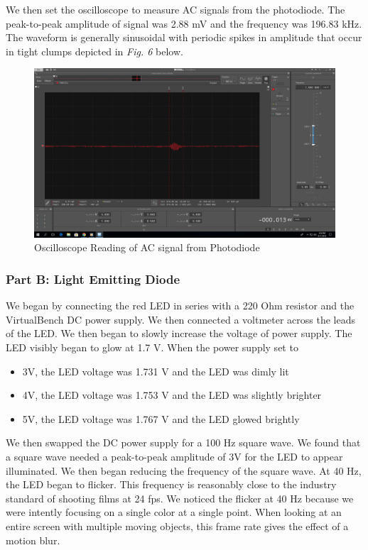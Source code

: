 \documentclass[10pt]{article}
\begin{document}
We then set the oscilloscope to measure AC signals from the photodiode. The peak-to-peak amplitude of signal was 2.88 mV and the frequency was 196.83 kHz. The waveform is generally sinusoidal with periodic spikes in amplitude that occur in tight clumps depicted in \textit{Fig. 6} below. 
\begin{center}
	\begin{figure} [H]
		\centering
		\includegraphics[scale = 0.22]{images/zoom.png}
		\caption{Oscilloscope Reading of AC signal from Photodiode}
		\label{fig:zoom}
	\end{figure}
\end{center}

\subsubsection{Part B: Light Emitting Diode}
We began by connecting the red LED in series with a 220 Ohm resistor and the VirtualBench DC power supply. We then connected a voltmeter across the leads of the LED. We then began to slowly increase the voltage of power supply. The LED visibly began to glow at 1.7 V. When the power supply set to 
\begin{itemize}
	\item 3V, the LED voltage was 1.731 V and the LED was dimly lit
	\item 4V, the LED voltage was 1.753 V and the LED was slightly brighter
	\item 5V, the LED voltage was 1.767 V and the LED glowed brightly
\end{itemize}

We then swapped the DC power supply for a 100 Hz square wave. We found that a square wave needed a peak-to-peak amplitude of 3V for the LED to appear illuminated. We then began reducing the frequency of the square wave. At 40 Hz, the LED began to flicker. This frequency is reasonably close to the industry standard of shooting films at 24 fps. We noticed the flicker at 40 Hz because we were intently focusing on a single color at a single point. When looking at an entire screen with multiple moving objects, this frame rate gives the effect of a motion blur. 
\end{document}
